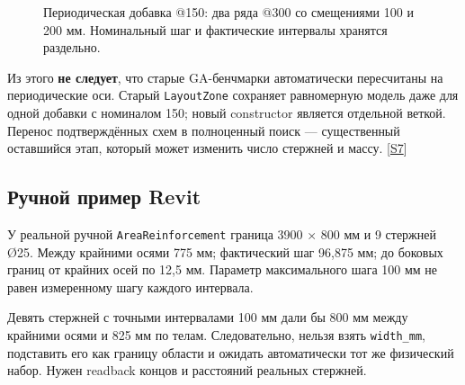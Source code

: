 \documentclass[11pt,a4paper]{article}
\begin{document}
\begin{figure}[H]
\caption{Периодическая добавка @150: два ряда @300 со смещениями 100 и 200 мм. Номинальный шаг и фактические интервалы хранятся раздельно.}\label{fig:07_axis_pattern}
\end{figure}

Из этого \textbf{не следует}, что старые GA-бенчмарки автоматически пересчитаны на периодические оси. Старый {\small\nolinkurl{LayoutZone}} сохраняет равномерную модель даже для одной добавки с номиналом 150; новый constructor является отдельной веткой. Перенос подтверждённых схем в полноценный поиск — существенный оставшийся этап, который может изменить число стержней и массу. {\color{Teal}\small[\hyperlink{S7}{S7}]}


\subsection{Ручной пример Revit}

У реальной ручной {\small\nolinkurl{AreaReinforcement}} граница 3900 × 800 мм и 9 стержней Ø25. Между крайними осями 775 мм; фактический шаг 96,875 мм; до боковых границ от крайних осей по 12,5 мм. Параметр максимального шага 100 мм не равен измеренному шагу каждого интервала.


Девять стержней с точными интервалами 100 мм дали бы 800 мм между крайними осями и 825 мм по телам. Следовательно, нельзя взять {\small\nolinkurl{width_mm}}, подставить его как границу области и ожидать автоматически тот же физический набор. Нужен readback концов и расстояний реальных стержней.
\end{document}
